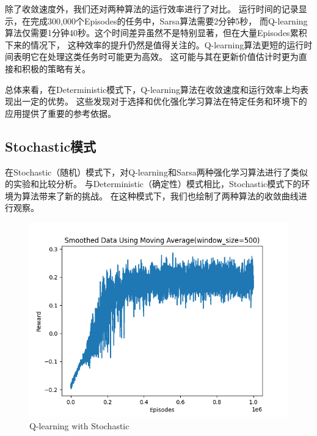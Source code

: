 \documentclass{thuemp}
\begin{document}
除了收敛速度外，我们还对两种算法的运行效率进行了对比。
运行时间的记录显示，在完成300,000个Episodes的任务中，Sarsa算法需要2分钟5秒，
而Q-learning算法仅需要1分钟40秒。这个时间差异虽然不是特别显著，但在大量Episodes累积下来的情况下，
这种效率的提升仍然是值得关注的。Q-learning算法更短的运行时间表明它在处理这类任务时可能更为高效。
这可能与其在更新价值估计时更为直接和积极的策略有关。

总体来看，在Deterministic模式下，Q-learning算法在收敛速度和运行效率上均表现出一定的优势。
这些发现对于选择和优化强化学习算法在特定任务和环境下的应用提供了重要的参考依据。\\
\vbox{}

\subsection{Stochastic模式}
在Stochastic（随机）模式下，对Q-learning和Sarsa两种强化学习算法进行了类似的实验和比较分析。
与Deterministic（确定性）模式相比，Stochastic模式下的环境为算法带来了新的挑战。
在这种模式下，我们也绘制了两种算法的收敛曲线进行观察。
\begin{figure}[H]
  \centering
  \includegraphics[width=1\linewidth]{./img/result/s/qls.png}
  \caption{Q-learning with Stochastic}
\end{figure}
\end{document}
